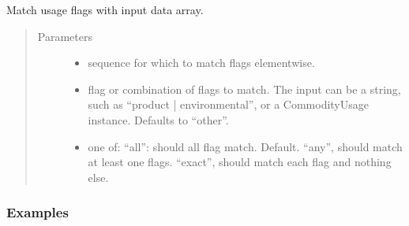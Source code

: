 \documentclass[letterpaper,10pt,english]{sphinxmanual}
\begin{document}
\begin{fulllineitems}
\label{\detokenize{api:muse.commodities.check_usage}}
Match usage flags with input data array.
\begin{quote}\begin{description}
\item[{Parameters}] \leavevmode\begin{itemize}
\item {} 
 \textendash{} sequence for which to match flags elementwise.

\item {} 
 \textendash{} flag or combination of flags to match. The input can be a string, such as
“product | environmental”, or a CommodityUsage instance.
Defaults to “other”.

\item {} 
 \textendash{} one of:
\sphinxhyphen{} “all”: should all flag match. Default.
\sphinxhyphen{} “any”, should match at least one flags.
\sphinxhyphen{} “exact”, should match each flag and nothing else.

\end{itemize}

\end{description}\end{quote}
\subsubsection*{Examples}

\begin{sphinxVerbatim}[commandchars=\\\{\}]
    
  \PYG{p}{[}
    
    
      
    
\PYG{p}{]}
\end{sphinxVerbatim}


\end{fulllineitems}
\end{document}
